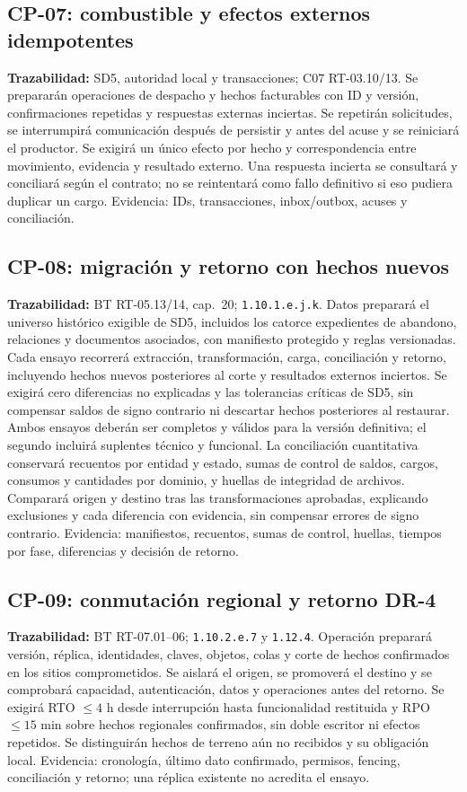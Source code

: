 \subsection{CP-07: combustible y efectos externos idempotentes}
\label{caso:cp-07}
\textbf{Trazabilidad:} SD5, autoridad local y transacciones; C07 RT-03.10/13. Se prepararán operaciones de despacho y hechos facturables con ID y versión, confirmaciones repetidas y respuestas externas inciertas. Se repetirán solicitudes, se interrumpirá comunicación después de persistir y antes del acuse y se reiniciará el productor. Se exigirá un único efecto por hecho y correspondencia entre movimiento, evidencia y resultado externo. Una respuesta incierta se consultará y conciliará según el contrato; no se reintentará como fallo definitivo si eso pudiera duplicar un cargo. Evidencia: IDs, transacciones, inbox/outbox, acuses y conciliación.

\subsection{CP-08: migración y retorno con hechos nuevos}
\label{caso:cp-08}
\textbf{Trazabilidad:} BT RT-05.13/14, cap.~20; \texttt{1.10.1.e.j.k}. Datos preparará el universo histórico exigible de SD5, incluidos los catorce expedientes de abandono, relaciones y documentos asociados, con manifiesto protegido y reglas versionadas. Cada ensayo recorrerá extracción, transformación, carga, conciliación y retorno, incluyendo hechos nuevos posteriores al corte y resultados externos inciertos. Se exigirá cero diferencias no explicadas y las tolerancias críticas de SD5, sin compensar saldos de signo contrario ni descartar hechos posteriores al restaurar. Ambos ensayos deberán ser completos y válidos para la versión definitiva; el segundo incluirá suplentes técnico y funcional. La conciliación cuantitativa conservará recuentos por entidad y estado, sumas de control de saldos, cargos, consumos y cantidades por dominio, y huellas de integridad de archivos. Comparará origen y destino tras las transformaciones aprobadas, explicando exclusiones y cada diferencia con evidencia, sin compensar errores de signo contrario. Evidencia: manifiestos, recuentos, sumas de control, huellas, tiempos por fase, diferencias y decisión de retorno.

\subsection{CP-09: conmutación regional y retorno DR-4}
\label{caso:cp-09}
\textbf{Trazabilidad:} BT RT-07.01--06; \texttt{1.10.2.e.7} y \texttt{1.12.4}. Operación preparará versión, réplica, identidades, claves, objetos, colas y corte de hechos confirmados en los sitios comprometidos. Se aislará el origen, se promoverá el destino y se comprobará capacidad, autenticación, datos y operaciones antes del retorno. Se exigirá RTO $\leq4$ h desde interrupción hasta funcionalidad restituida y RPO $\leq15$ min sobre hechos regionales confirmados, sin doble escritor ni efectos repetidos. Se distinguirán hechos de terreno aún no recibidos y su obligación local. Evidencia: cronología, último dato confirmado, permisos, fencing, conciliación y retorno; una réplica existente no acredita el ensayo.

